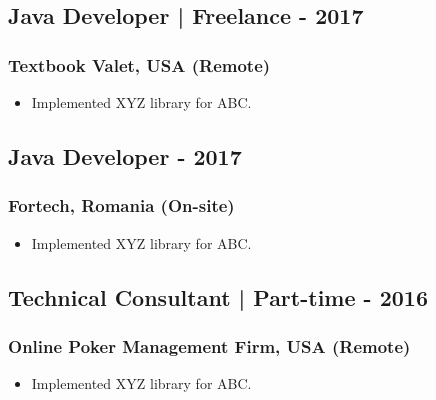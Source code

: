 \documentclass[11pt]{article}
\begin{document}
    \subsection{Java Developer | Freelance \hfill {} - 2017}
    \subsubsection{Textbook Valet, USA (Remote)}
    \begin{itemize}
        \item[\checkmark]  Implemented XYZ library for ABC.
    \end{itemize}
    
    \subsection{Java Developer \hfill {} - 2017}
    \subsubsection{Fortech, Romania (On-site)}
    \begin{itemize}
        \item[\checkmark]  Implemented XYZ library for ABC.
    \end{itemize}
    
    \subsection{Technical Consultant | Part-time \hfill {} - 2016}
    \subsubsection{Online Poker Management Firm, USA (Remote)}
    \begin{itemize}
        \item[\checkmark]  Implemented XYZ library for ABC.
    \end{itemize}
\end{document}
